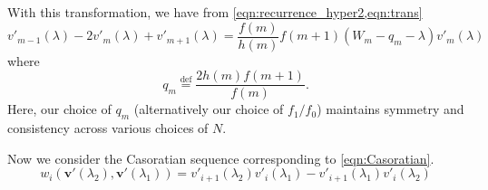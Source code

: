     With this transformation, we have from \cref{eqn:recurrence_hyper2,eqn:trans}
    \begin{equation}\label{eqn:recurrence_hyper3}
    	v'_{m-1}(\lambda)-2v'_m(\lambda)+v'_{m+1}(\lambda) = \frac{f(m)}{h(m)}{f(m+1)}(W_m - q_m -\lambda)v'_m(\lambda)
    \end{equation}
     where
    \begin{equation}
    	q_m \stackrel{\text{def}}{=} \frac{2 h(m)f(m+1)}{f(m)}.
    \end{equation}
    Here, our choice of $q_m$ (alternatively our choice of $f_1/f_0$) maintains symmetry and consistency across various choices of $N$.

    Now we consider the Casoratian sequence corresponding to \cref{eqn:Casoratian}.
    \begin{equation}
    	w_i(\mathbf{v'}(\lambda_2),\mathbf{v'}(\lambda_1)) = v'_{i+1}(\lambda_2)v'_i(\lambda_1) - v'_{i+1}(\lambda_1)v'_i(\lambda_2)
    \end{equation}

